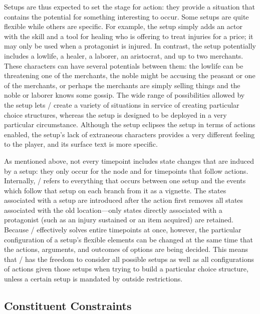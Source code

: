 Setups are thus expected to set the stage for action: they provide a situation that contains the potential for something interesting to occur.
%
Some setups are quite flexible while others are specific.
%
For example, the  setup simply adds an actor with the  skill and a tool for healing who is offering to treat injuries for a price; it may only be used when a protagonist is injured.
%
In contrast, the  setup potentially includes a lowlife, a healer, a laborer, an aristocrat, and up to two merchants.
%
These characters can have several potentials between them: the lowlife can be threatening one of the merchants, the noble might be accusing the peasant or one of the merchants, or perhaps the merchants are simply selling things and the noble or laborer knows some gossip.
%
The wide range of possibilities allowed by the  setup lets \dunyazad/ create a variety of situations in service of creating particular choice structures, whereas the  setup is designed to be deployed in a very particular circumstance.
%
Although the  setup eclipses the  setup in terms of actions enabled, the  setup's lack of extraneous characters provides a very different feeling to the player, and its surface text is more specific.


As mentioned above, not every timepoint includes state changes that are induced by a setup: they only occur for the  node and for timepoints that follow  actions.
%
Internally, \dunyazad/ refers to everything that occurs between one setup and the  events which follow that setup on each branch from it as a vignette.
%
The states associated with a setup are introduced after the  action first removes all states associated with the old location---only states directly associated with a protagonist (such as an injury sustained or an item acquired) are retained.
%
Because \dunyazad/ effectively solves entire timepoints at once, however, the particular configuration of a setup's flexible elements can be changed at the same time that the actions, arguments, and outcomes of options are being decided.
%
This means that \dunyazad/ has the freedom to consider all possible setups as well as all configurations of actions given those setups when trying to build a particular choice structure, unless a certain setup is mandated by outside restrictions.


\subsection{Constituent Constraints}

